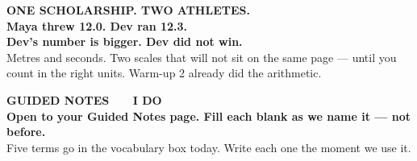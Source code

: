 \documentclass[aspectratio=169, 11pt]{beamer}
\begin{document}
{
\begin{frame}[plain]
  \vspace{1.4cm}
  \begin{center}
    {\color{skymid}\bfseries\small ONE SCHOLARSHIP. TWO ATHLETES.}\\[0.9cm]
    {\color{white}\bfseries\Large Maya threw \textbf{12.0}. \quad Dev ran \textbf{12.3}.\\[0.4cm]
    Dev's number is bigger. Dev did not win.}\\[0.9cm]
    {\color{goldacc}\small Metres and seconds. Two scales that will not sit on the same page ---
    until you count in the right units. Warm-up 2 already did the arithmetic.}
  \end{center}
\end{frame}
}

{
\begin{frame}[plain]
  \vspace{1.8cm}\hspace{0.8cm}%
  \begin{minipage}{0.86\textwidth}
    {\color{goldacc}\bfseries\small GUIDED NOTES \ \textbullet\ \ I DO}\\[0.7cm]
    {\color{white}\bfseries\Large Open to your Guided Notes page. Fill each blank as we
    name it --- not before.}\\[0.9cm]
    {\color{skymid}\small Five terms go in the vocabulary box today. Write each one the
    moment we use it.}
  \end{minipage}
\end{frame}
}
\end{document}
